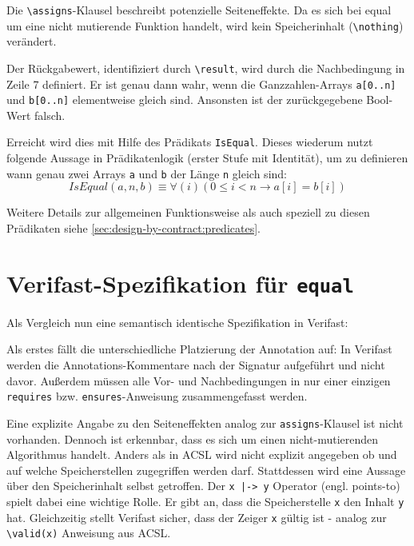 Die \lstinline{\assigns}-Klausel beschreibt potenzielle Seiteneffekte. Da es sich bei equal um eine nicht mutierende
Funktion handelt, wird kein Speicherinhalt (\lstinline{\nothing}) verändert.

Der Rückgabewert, identifiziert durch \lstinline{\result}, wird durch die Nachbedingung in Zeile 7 definiert. Er ist genau dann
wahr, wenn die Ganzzahlen-Arrays \lstinline{a[0..n]} und \lstinline{b[0..n]} elementweise gleich sind. Ansonsten ist der 
zurückgegebene Bool-Wert falsch. 

Erreicht wird dies mit Hilfe des Prädikats \lstinline{IsEqual}. Dieses wiederum
nutzt folgende Aussage in Prädikatenlogik (erster Stufe mit Identität), um zu definieren wann genau 
zwei Arrays \lstinline{a} und \lstinline{b} der Länge \lstinline{n} gleich sind:
\[IsEqual(a, n, b) \equiv \forall(i) (0 \leq i < n \rightarrow a[i] = b[i])\]

Weitere Details zur allgemeinen Funktionsweise als auch speziell zu diesen Prädikaten siehe
\ref{sec:design-by-contract:predicates}.



\section{Verifast-Spezifikation für \texttt{equal}}
\label{sec:design-by-contract:verifast-variante}

Als Vergleich nun eine semantisch identische Spezifikation in Verifast:



Als erstes fällt die unterschiedliche Platzierung der Annotation auf: In Verifast werden die 
Annotations-Kommentare nach der Signatur aufgeführt und nicht davor. Außerdem müssen alle Vor- und 
Nachbedingungen in nur einer einzigen \lstinline{requires} bzw. \lstinline{ensures}-Anweisung 
zusammengefasst werden.

Eine explizite Angabe zu den Seiteneffekten analog zur \lstinline{assigns}-Klausel ist nicht vorhanden. 
Dennoch ist erkennbar, dass es sich um einen nicht-mutierenden Algorithmus handelt. Anders als in ACSL wird 
nicht explizit angegeben ob und auf welche Speicherstellen zugegriffen werden darf. Stattdessen wird eine 
Aussage über den Speicherinhalt selbst getroffen. Der \lstinline{x |-> y} Operator (engl. points-to) spielt dabei eine wichtige Rolle. Er gibt an, 
dass die Speicherstelle \lstinline{x} den Inhalt \lstinline{y} hat. Gleichzeitig stellt Verifast sicher, 
dass der Zeiger \lstinline{x} gültig ist - analog zur \lstinline{\valid(x)} Anweisung aus ACSL.

